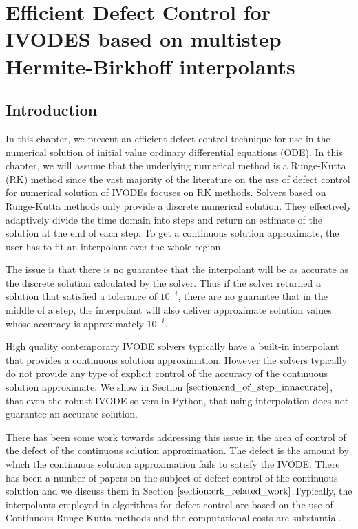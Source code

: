 \documentclass{article}
\begin{document}
\section{Efficient Defect Control for IVODES based on multistep Hermite-Birkhoff interpolants}
\subsection{Introduction}

In this chapter, we present an efficient defect control technique for use in the numerical solution of initial value ordinary differential equations (ODE). In this chapter, we will assume that the underlying numerical method is a Runge-Kutta (RK) method since the vast majority of the literature on the use of defect control for numerical solution of IVODEs focuses on RK methods. Solvers based on Runge-Kutta methods only provide a discrete numerical solution. They effectively adaptively divide the time domain into steps and return an estimate of the solution at the end of each step. To get a continuous solution approximate, the user has to fit an interpolant over the whole region.

The issue is that there is no guarantee that the interpolant will be as accurate as the discrete solution calculated by the solver. Thus if the solver returned a solution that satisfied a tolerance of $10^{-i}$, there are no guarantee that in the middle of a step, the interpolant will also deliver approximate solution values whose accuracy is approximately $10^{-i}$. 

High quality contemporary IVODE solvers typically have a built-in interpolant that provides a continuous solution approximation. However the solvers typically do not provide any type of explicit control of the accuracy of the continuous solution approximate. We show in Section $\ref{section:end_of_step_innacurate}$, that even the robust IVODE solvers in Python, that using interpolation does not guarantee an accurate solution. 


There has been some work towards addressing this issue in the area of control of the defect of the continuous solution approximation. The defect is the amount by which the continuous solution approximation fails to satisfy the IVODE. There has been a number of papers on the subject of defect control of the continuous solution and we discuss them in Section $\ref{section:crk_related_work}$.Typically, the interpolants employed in algorithms for defect control are based on the use of Continuous Runge-Kutta methods and the computational costs are substantial.
\end{document}
